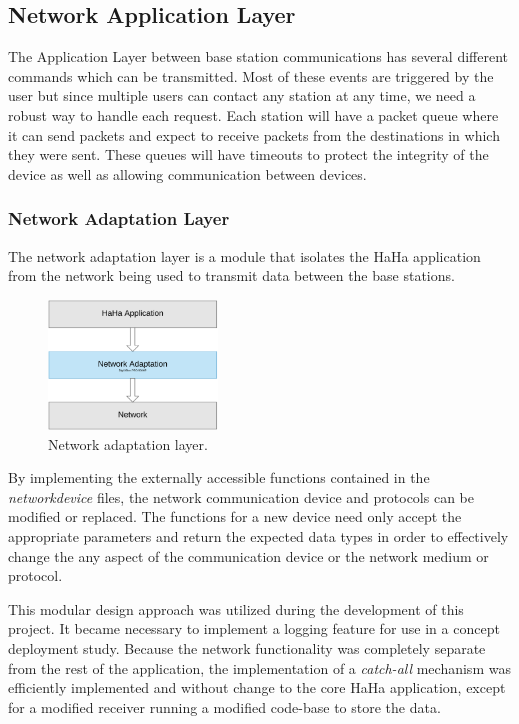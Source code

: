 \documentclass[journal,compsoc]{IEEEtran}
\begin{document}
\subsection{Network Application Layer}

The Application Layer between base station communications has several different commands which can be transmitted.  Most of these events are triggered by the user but since multiple users can contact any station at any time, we need a robust way to handle each request. 
Each station will have a packet queue where it can send packets and expect to receive packets from the destinations in which they were sent.  These queues will have timeouts to protect the integrity of the device as well as allowing communication between devices.

\subsubsection{Network Adaptation Layer}

The network adaptation layer is a module that isolates the HaHa application from the network being used to transmit data between the base stations. 

\begin{figure}[ht] 	%
\centering
\includegraphics[width=0.4\textwidth]{NetAdaptation.png}
\caption{ \space Network adaptation layer.}
\label{Network Adaptation}
\end{figure}

By implementing the externally accessible functions contained in the {\it networkdevice} files, the network communication device and protocols can be modified or replaced. The functions for a new device need only accept the appropriate parameters and return the expected data types in order to effectively change the any aspect of the communication device or the network medium or protocol.

This modular design approach was utilized during the development of this project. It became necessary to implement a logging feature for use in a concept deployment study. Because the network functionality was completely separate from the rest of the application, the implementation of a {\it catch-all} mechanism was efficiently implemented and without change to the core HaHa application, except for a modified receiver running a modified code-base to store the data.
\end{document}
